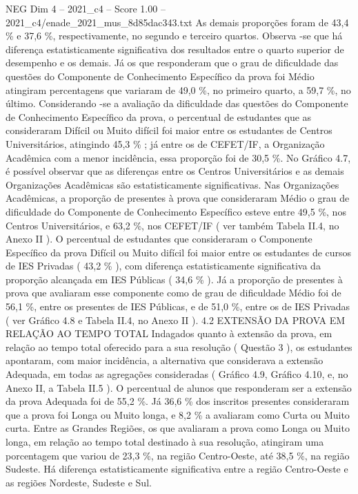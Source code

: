 \begin{textsample}{NEG Dim 4 – 2021\_c4 – Score 1.00 – 2021\_c4/enade\_2021\_mus\_8d85dac343.txt}
As demais proporções foram de 43,4 \% e 37,6 \%, respectivamente, no segundo e terceiro quartos.
Observa -se que há diferença estatisticamente significativa dos resultados entre o quarto superior de desempenho e os demais.
Já os que responderam que o grau de dificuldade das questões do Componente de Conhecimento Específico da prova foi Médio atingiram percentagens que variaram de 49,0 \%, no primeiro quarto, a 59,7 \%, no último.
Considerando -se a avaliação da dificuldade das questões do Componente de Conhecimento Específico da prova, o percentual de estudantes que as consideraram Difícil ou Muito difícil foi maior entre os estudantes de Centros Universitários, atingindo 45,3 \% ; já entre os de CEFET/IF, a Organização Acadêmica com a menor incidência, essa proporção foi de 30,5 \%.
No Gráfico 4.7, é possível observar que as diferenças entre os Centros Universitários e as demais Organizações Acadêmicas são estatisticamente significativas.
Nas Organizações Acadêmicas, a proporção de presentes à prova que consideraram Médio o grau de dificuldade do Componente de Conhecimento Específico esteve entre 49,5 \%, nos Centros Universitários, e 63,2 \%, nos CEFET/IF ( ver também Tabela II.4, no Anexo II ).
O percentual de estudantes que consideraram o Componente Específico da prova Difícil ou Muito difícil foi maior entre os estudantes de cursos de IES Privadas ( 43,2 \% ), com diferença estatisticamente significativa da proporção alcançada em IES Públicas ( 34,6 \% ).
Já a proporção de presentes à prova que avaliaram esse componente como de grau de dificuldade Médio foi de 56,1 \%, entre os presentes de IES Públicas, e de 51,0 \%, entre os de IES Privadas ( ver Gráfico 4.8 e Tabela II.4, no Anexo II ). 4.2 EXTENSÃO DA PROVA EM RELAÇÃO AO TEMPO TOTAL Indagados quanto à extensão da prova, em relação ao tempo total oferecido para a sua resolução ( Questão 3 ), os estudantes apontaram, com maior incidência, a alternativa que considerava a extensão Adequada, em todas as agregações consideradas ( Gráfico 4.9, Gráfico 4.10, e, no Anexo II, a Tabela II.5 ).
O percentual de alunos que responderam ser a extensão da prova Adequada foi de 55,2 \%.
Já 36,6 \% dos inscritos presentes consideraram que a prova foi Longa ou Muito longa, e 8,2 \% a avaliaram como Curta ou Muito curta.
Entre as Grandes Regiões, os que avaliaram a prova como Longa ou Muito longa, em relação ao tempo total destinado à sua resolução, atingiram uma porcentagem que variou de 23,3 \%, na região Centro-Oeste, até 38,5 \%, na região Sudeste.
Há diferença estatisticamente significativa entre a região Centro-Oeste e as regiões Nordeste, Sudeste e Sul.

\end{textsample}
